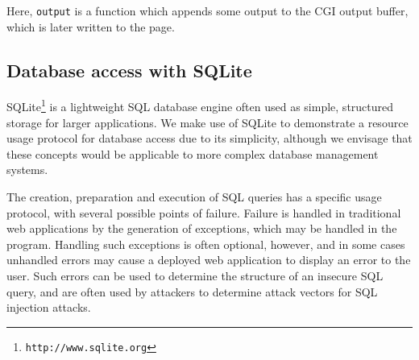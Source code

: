 \noindent
Here, \texttt{output} is a function which appends some output to the CGI output buffer, which is later written to the page.

\subsection{Database access with SQLite}

SQLite\footnote{\texttt{http://www.sqlite.org}} is a lightweight SQL database
engine often used as simple, structured storage for larger applications. We
make use of SQLite to demonstrate a resource usage protocol for database access due to its simplicity, although we envisage that these
concepts would be applicable to more complex database management systems. 

The creation, preparation and execution of SQL queries has a specific usage
protocol, with several possible points of failure. Failure is handled in
traditional web applications by the generation of exceptions, which may be
handled in the program.  Handling such exceptions is often optional, however,
and in some cases unhandled errors may cause a deployed web application to
display an error to the user. Such errors can be used to determine the
structure of an insecure SQL query, and are often used by attackers to
determine attack vectors for SQL injection attacks.

